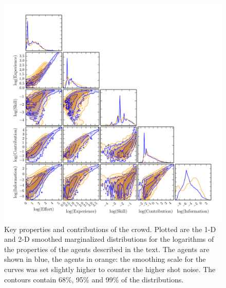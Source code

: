 \documentclass[useAMS,usenatbib,a4paper]{mn2e}
\begin{document}
\begin{figure}
\centering\includegraphics[width=0.9\linewidth]{sw-system-figs/all_skill_contribution_experience_education.png}
\caption{Key properties and contributions of the \SW crowd. Plotted are the 1-D
and 2-D smoothed marginalized distributions for  the logarithms of the
properties of the agents described in the text. The  \StageOne agents are shown
in blue, the \StageTwo agents in orange: the  smoothing scale for the \StageTwo
curves was set slightly higher to counter the  higher shot noise. The contours
contain 68\%, 95\% and 99\% of the distributions.}
\label{fig:crowd:cornerplot}
\end{figure}
\end{document}
